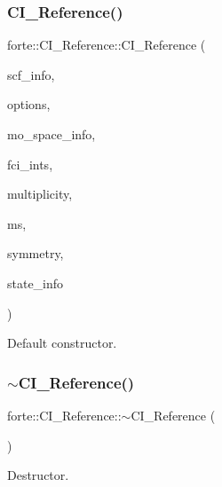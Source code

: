 \subsubsection{\texorpdfstring{C\+I\+\_\+\+Reference()}{CI\_Reference()}}
{\footnotesize\ttfamily forte\+::\+C\+I\+\_\+\+Reference\+::\+C\+I\+\_\+\+Reference (\begin{DoxyParamCaption}\item[{std\+::shared\+\_\+ptr$<$ \mbox{\hyperlink{classforte_1_1_s_c_f_info}{S\+C\+F\+Info}} $>$}]{scf\+\_\+info,  }\item[{std\+::shared\+\_\+ptr$<$ \mbox{\hyperlink{classforte_1_1_forte_options}{Forte\+Options}} $>$}]{options,  }\item[{std\+::shared\+\_\+ptr$<$ \mbox{\hyperlink{classforte_1_1_m_o_space_info}{M\+O\+Space\+Info}} $>$}]{mo\+\_\+space\+\_\+info,  }\item[{std\+::shared\+\_\+ptr$<$ \mbox{\hyperlink{classforte_1_1_active_space_integrals}{Active\+Space\+Integrals}} $>$}]{fci\+\_\+ints,  }\item[{int}]{multiplicity,  }\item[{double}]{ms,  }\item[{int}]{symmetry,  }\item[{\mbox{\hyperlink{classforte_1_1_state_info}{State\+Info}}}]{state\+\_\+info }\end{DoxyParamCaption})}



Default constructor. 

\mbox{\label{classforte_1_1_c_i___reference_a35b5f56e2dc8ad209ae7afbcb7ef3e69}} 
\subsubsection{\texorpdfstring{$\sim$\+C\+I\+\_\+\+Reference()}{~CI\_Reference()}}
{\footnotesize\ttfamily forte\+::\+C\+I\+\_\+\+Reference\+::$\sim$\+C\+I\+\_\+\+Reference (\begin{DoxyParamCaption}{ }\end{DoxyParamCaption})}



Destructor. 



